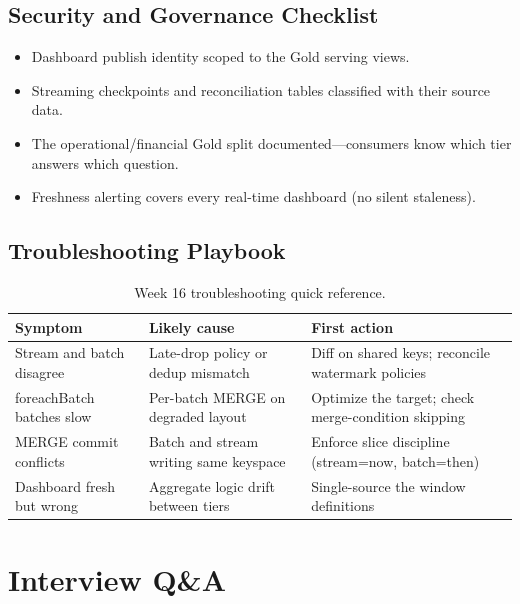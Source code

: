 \subsection{Security and Governance Checklist}
\begin{itemize}
    \item Dashboard publish identity scoped to the Gold serving views.
    \item Streaming checkpoints and reconciliation tables classified with their source data.
    \item The operational/financial Gold split documented---consumers know which tier answers which question.
    \item Freshness alerting covers every real-time dashboard (no silent staleness).
\end{itemize}

\subsection{Troubleshooting Playbook}
\begin{table}[H]
\centering
\small
\begin{tabular}{@{}p{3.6cm}p{4.2cm}p{4.8cm}@{}}
\toprule
\textbf{Symptom} & \textbf{Likely cause} & \textbf{First action} \\
\midrule
Stream and batch disagree & Late-drop policy or dedup mismatch & Diff on shared keys; reconcile watermark policies \\
foreachBatch batches slow & Per-batch MERGE on degraded layout & Optimize the target; check merge-condition skipping \\
MERGE commit conflicts & Batch and stream writing same keyspace & Enforce slice discipline (stream=now, batch=then) \\
Dashboard fresh but wrong & Aggregate logic drift between tiers & Single-source the window definitions \\
\bottomrule
\end{tabular}
\caption{Week 16 troubleshooting quick reference.}
\label{tab:ch16-trouble}
\end{table}

\section{Interview Q\&A}
